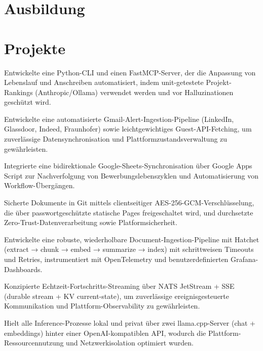 \documentclass[11pt,a4paper]{resume}
\begin{document}
\section{Ausbildung}

\vspace{2pt}

\section{Projekte}

\bullets
  \item Entwickelte eine Python-CLI und einen FastMCP-Server, der die Anpassung von Lebenslauf und Anschreiben automatisiert, indem unit-getestete Projekt-Rankings (Anthropic/Ollama) verwendet werden und vor Halluzinationen geschützt wird.
  \item Entwickelte eine automatisierte Gmail-Alert-Ingestion-Pipeline (LinkedIn, Glassdoor, Indeed, Fraunhofer) sowie leichtgewichtiges Guest-API-Fetching, um zuverlässige Datensynchronisation und Plattformzustandsverwaltung zu gewährleisten.
  \item Integrierte eine bidirektionale Google-Sheets-Synchronisation über Google Apps Script zur Nachverfolgung von Bewerbungslebenszyklen und Automatisierung von Workflow-Übergängen.
  \item Sicherte Dokumente in Git mittels clientseitiger AES-256-GCM-Verschlüsselung, die über passwortgeschützte statische Pages freigeschaltet wird, und durchsetzte Zero-Trust-Datenverarbeitung sowie Platformsicherheit.
\bulletsend
\vspace{2pt}
\bullets
  \item Entwickelte eine robuste, wiederholbare Document-Ingestion-Pipeline mit Hatchet (extract → chunk → embed → summarize → index) mit schrittweisen Timeouts und Retries, instrumentiert mit OpenTelemetry und benutzerdefinierten Grafana-Dashboards.
  \item Konzipierte Echtzeit-Fortschritts-Streaming über NATS JetStream + SSE (durable stream + KV current-state), um zuverlässige ereignisgesteuerte Kommunikation und Plattform-Observability zu gewährleisten.
  \item Hielt alle Inference-Prozesse lokal und privat über zwei llama.cpp-Server (chat + embeddings) hinter einer OpenAI-kompatiblen API, wodurch die Plattform-Ressourcennutzung und Netzwerkisolation optimiert wurden.
\end{document}
